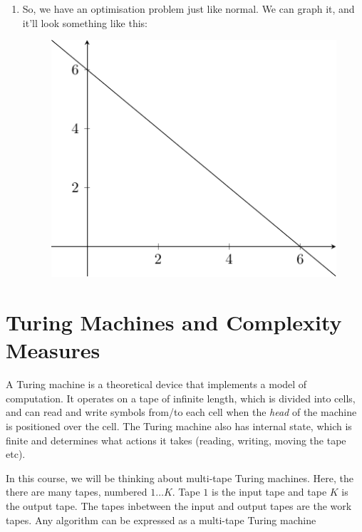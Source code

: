 \begin{enumerate}
  \item So, we have an optimisation problem just like normal. We can graph it, 
  and it'll look something like this:

  \begin{figure}[h]
    \centering
    \includegraphics{diagrams/graph5}
    \caption{}
    \label{fig:graph-5}
  \end{figure}


\end{enumerate}

\section{Turing Machines and Complexity Measures}

A Turing machine is a theoretical device that implements a model of computation.
It operates on a tape of infinite length, which is divided into cells, and can
read and write symbols from/to each cell when the \textit{head} of the machine
is positioned over the cell. The Turing machine also has internal state, which
is finite and determines what actions it takes (reading, writing, moving the
tape etc).

In this course, we will be thinking about multi-tape Turing machines. Here, the
there are many tapes, numbered $1 \dots K$. Tape $1$ is the input tape and tape
$K$ is the output tape. The tapes inbetween the input and output tapes are the
work tapes. Any algorithm can be expressed as a multi-tape Turing machine


